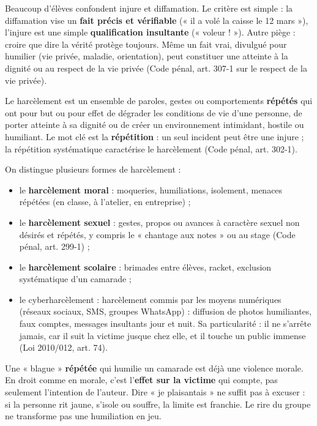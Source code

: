 \documentclass[11pt]{article}
\newcommand{\cle}[1]{{\popxbold\color{popdark}#1}}
\newcounter{popsec}
\newcounter{popsub}
\newcommand{\courssub}[1]{%
  \stepcounter{popsub}%
  \par\vspace{9pt}\noindent{\popxbold\fontsize{11.5}{13}\selectfont\color{popink}{\color{poporange}\thepopsec.\thepopsub}\hspace{6pt}#1}\par\nopagebreak\vspace{4pt}
}
\begin{document}
\begin{attention}
Beaucoup d'élèves confondent injure et diffamation. Le critère est simple : la diffamation vise un \textbf{fait précis et vérifiable} (« il a volé la caisse le 12 mars »), l'injure est une simple \textbf{qualification insultante} (« voleur ! »). Autre piège : croire que dire la vérité protège toujours. Même un fait vrai, divulgué pour humilier (vie privée, maladie, orientation), peut constituer une atteinte à la dignité ou au respect de la vie privée (Code pénal, art. 307-1 sur le respect de la vie privée).
\end{attention}

\courssub{Le harcèlement et le cyberharcèlement}

\begin{definition}[Harcèlement]
Le \cle{harcèlement} est un ensemble de paroles, gestes ou comportements \textbf{répétés} qui ont pour but ou pour effet de dégrader les conditions de vie d'une personne, de porter atteinte à sa dignité ou de créer un environnement intimidant, hostile ou humiliant. Le mot clé est la \textbf{répétition} : un seul incident peut être une injure ; la répétition systématique caractérise le harcèlement (Code pénal, art. 302-1).
\end{definition}

On distingue plusieurs formes de harcèlement :
\begin{itemize}
\item le \textbf{harcèlement moral} : moqueries, humiliations, isolement, menaces répétées (en classe, à l'atelier, en entreprise) ;
\item le \textbf{harcèlement sexuel} : gestes, propos ou avances à caractère sexuel non désirés et répétés, y compris le « chantage aux notes » ou au stage (Code pénal, art. 299-1) ;
\item le \textbf{harcèlement scolaire} : brimades entre élèves, racket, exclusion systématique d'un camarade ;
\item le \cle{cyberharcèlement} : harcèlement commis par les moyens numériques (réseaux sociaux, SMS, groupes WhatsApp) : diffusion de photos humiliantes, faux comptes, messages insultants jour et nuit. Sa particularité : il ne s'arrête jamais, car il suit la victime jusque chez elle, et il touche un public immense (Loi 2010/012, art. 74).
\end{itemize}

\begin{attention}
Une « blague » \textbf{répétée} qui humilie un camarade est déjà une violence morale. En droit comme en morale, c'est l'\textbf{effet sur la victime} qui compte, pas seulement l'intention de l'auteur. Dire « je plaisantais » ne suffit pas à excuser : si la personne rit jaune, s'isole ou souffre, la limite est franchie. Le rire du groupe ne transforme pas une humiliation en jeu.
\end{attention}
\end{document}
